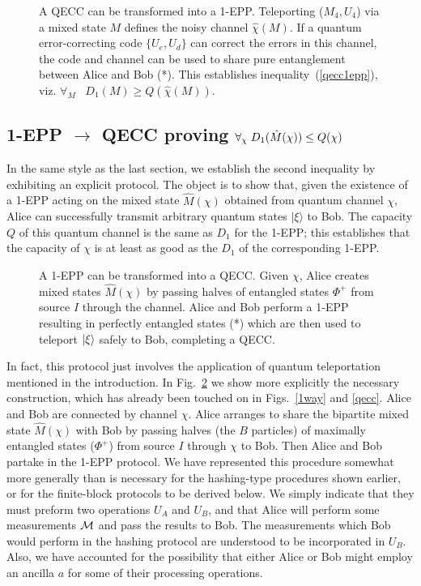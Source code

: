 \begin{figure}[htbp]
\centerline{}
\caption[A QECC can be transformed into a 1-EPP]
{A QECC can be transformed into a 1-EPP.
Teleporting ($M_4, U_4$) via a mixed state $M$ defines the noisy channel $\hat{\chi}(M)$.
If a quantum error-correcting code $\{U_e, U_d\}$ can correct the errors
in this channel, the code and channel can be used to share pure 
entanglement between Alice and Bob (*).  This establishes 
inequality~(\ref{qecc1epp}), viz.
$\forall_M \;\;\; D_1(M) \geq Q(\hat{\chi}(M))$.}
\label{ineq1fig}
\end{figure}
 
\subsection{
1-EPP $\rightarrow$ QECC proving
$\boldmath{\forall_{\chi} \; D_1(\hat{M}(\chi)) \leq Q(\chi)}$} 
\label{ineq2}
 
In the same style as the last section, we establish the second
inequality by exhibiting an explicit protocol.  The object is to show
that, given the existence of a 1-EPP acting on the mixed state $\hat{M}(\chi)$
obtained from quantum channel $\chi$, Alice can successfully transmit
arbitrary quantum states $|\xi\rangle$ to Bob.  The capacity $Q$ of
this quantum channel is the same as $D_1$ for the 1-EPP; this
establishes that the capacity of $\chi$ is at least as good as the $D_1$
of the corresponding 1-EPP.
\begin{figure}[htbp]
\centerline{}
\caption[A 1-EPP can be transformed into a QECC]
{A 1-EPP can be transformed into a QECC.  Given $\chi$,
Alice creates mixed states $\hat{M}(\chi)$ by passing halves
of entangled states $\Phi^+$ from source $I$ through the
channel.  Alice and Bob perform a 1-EPP resulting in 
perfectly entangled states (*) which are then used to teleport
$| \xi \rangle$ safely to Bob, completing a QECC.}
\label{ineq2fig}
\end{figure}
 
In fact, this protocol just involves the application of quantum
teleportation~\cite{teleportation}
mentioned in the introduction.  In Fig.~\ref{ineq2fig}
we show more explicitly the necessary construction, which has already
been touched on in Figs.~\ref{1way} and \ref{qecc}.  Alice and Bob
are connected by channel $\chi$.  Alice arranges to share the bipartite
mixed state $\hat{M}(\chi)$ with Bob by passing halves (the $B$ particles)
of maximally entangled
states ($\Phi^+$) from source $I$ through $\chi$ to Bob.
Then Alice and Bob
partake in the 1-EPP protocol.  We have represented this procedure
somewhat more generally than is necessary for the hashing-type
procedures shown earlier, or for the finite-block protocols to be
derived below.  We simply indicate that they must preform two
operations $U_A$ and $U_B$, and that Alice will perform some
measurements $\cal M$ and pass the results to Bob.  The
measurements which Bob would perform in the hashing protocol are
understood to be incorporated in $U_B$.  Also, we have accounted
for the possibility that either Alice or Bob might employ an
ancilla $a$ for some of their processing operations.
 
